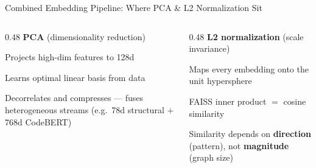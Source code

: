\documentclass[aspectratio=169,10pt]{beamer}
\begin{document}
\begin{frame}[fragile]{Combined Embedding Pipeline: Where PCA \& L2 Normalization Sit}
  \vspace{0.8em}
  \begin{columns}[T]
  \begin{column}{0.48\textwidth}
    \textbf{PCA} {\small(dimensionality reduction)}
    \begin{itemize}\setlength{\itemsep}{2pt}
      {\scriptsize
      \item Projects high-dim features to 128d
      \item Learns optimal linear basis from data
      \item Decorrelates and compresses — fuses heterogeneous streams (e.g.\ 78d structural $+$ 768d CodeBERT)}
    \end{itemize}
  \end{column}
  \begin{column}{0.48\textwidth}
    \textbf{L2 normalization} {\small(scale invariance)}
    \begin{itemize}\setlength{\itemsep}{2pt}
      {\scriptsize
      \item Maps every embedding onto the unit hypersphere
      \item FAISS inner product $=$ cosine similarity
      \item Similarity depends on \textbf{direction} (pattern), not \textbf{magnitude} (graph size)}
    \end{itemize}
  \end{column}
  \end{columns}
\end{frame}
\end{document}
